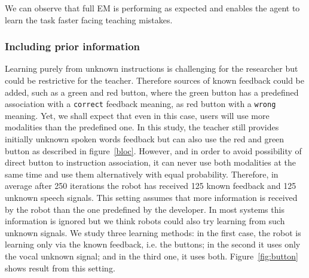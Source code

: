 We can observe that full EM is performing as expected and enables the agent to learn the task faster facing teaching mistakes. %

\subsubsection{Including prior information}
\label{sec:IncludingPriorInformation}
%
Learning purely from unknown instructions is challenging for the researcher but could be restrictive for the teacher. Therefore sources of known feedback could be added, such as a green and red button, where the green button has a predefined association with a \texttt{correct} feedback meaning, as red button with a \texttt{wrong} meaning. Yet, we shall expect that even in this case, users will use more modalities than the predefined one. 
In this study, the teacher still provides initially unknown spoken words feedback but can also use the red and green button as described in figure~\ref{bloc}. However, and in order to avoid possibility of direct button to instruction association, it can never use both modalities at the same time and use them alternatively with equal probability. 
Therefore, in average after 250 iterations the robot has received 125 known feedback and 125 unknown speech signals. This setting assumes that more information is received by the robot than the one predefined by the developer. In most systems this information is ignored but we think robots could also try learning from such unknown signals. We study three learning methods: in the first case, the robot is learning only via the known feedback, i.e. the buttons; in the second it uses only the vocal unknown signal; and in the third one, it uses both.  Figure~\ref{fig:button} shows result from this setting. 
%
